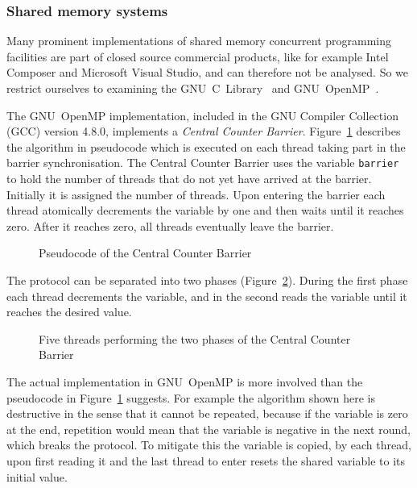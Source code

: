 \documentclass[a4paper, 10pt]{article}
\begin{document}
\subsubsection{Shared memory systems}
\label{sssec:background-currently-used-shared}

Many prominent implementations of shared memory concurrent programming facilities are part of closed source commercial products, like for example Intel Composer and Microsoft Visual Studio, and can therefore not be analysed. So we restrict ourselves to examining the GNU~C~Library~\cite{glibc} and GNU~OpenMP~\cite{gomp}.

The GNU~OpenMP implementation, included in the GNU Compiler Collection (GCC) version 4.8.0, implements a \emph{Central Counter Barrier}. Figure~\ref{fig:pseudocode-central-counter} describes the algorithm in pseudocode which is executed on each thread taking part in the barrier synchronisation.
The Central Counter Barrier uses the variable \texttt{barrier} to hold the number of threads that do not yet have arrived at the barrier. Initially it is assigned the number of threads. Upon entering the barrier each thread atomically decrements the variable by one and then waits until it reaches zero. After it reaches zero, all threads eventually leave the barrier.

\begin{figure}[H]
	\centering
	
	\caption{Pseudocode of the Central Counter Barrier}
	\label{fig:pseudocode-central-counter}
\end{figure}

The protocol can be separated into two phases (Figure~\ref{fig:diagram-central-counter}). During the first phase each thread decrements the variable, and in the second reads the variable until it reaches the desired value.

\begin{figure}[H]
	\centering
	
	\caption{Five threads performing the two phases of the Central Counter Barrier}
	\label{fig:diagram-central-counter}
\end{figure}

The actual implementation in GNU~OpenMP is more involved than the pseudocode in Figure~\ref{fig:pseudocode-central-counter} suggests. For example the algorithm shown here is destructive in the sense that it cannot be repeated, because if the variable is zero at the end, repetition would mean that the variable is negative in the next round, which breaks the protocol. To mitigate this the variable is copied, by each thread, upon first reading it and the last thread to enter resets the shared variable to its initial value.
\end{document}
